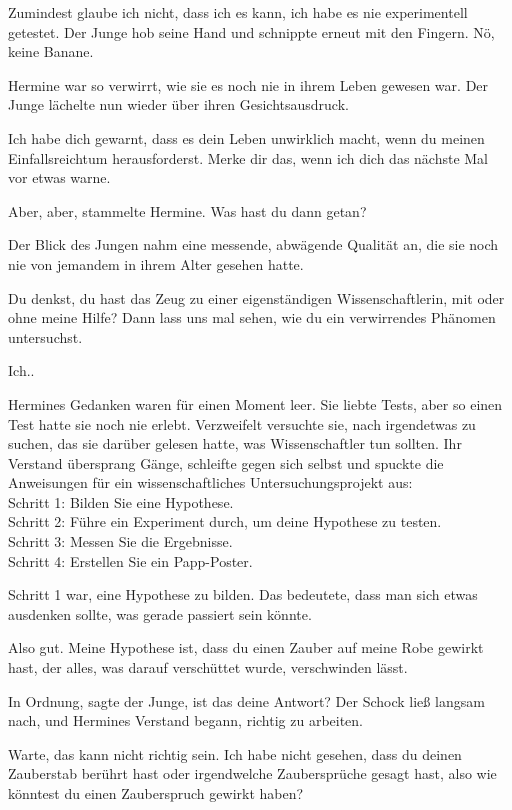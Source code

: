 \glqq{}Zumindest glaube ich nicht, dass ich es kann, ich habe es nie
experimentell getestet.\grqq{} Der Junge hob seine Hand und schnippte erneut mit
den Fingern. \glqq{}Nö, keine Banane.\grqq{}

Hermine war so verwirrt, wie sie es noch nie in ihrem Leben gewesen war. Der
Junge lächelte nun wieder über ihren Gesichtsausdruck.

\glqq{}Ich habe dich gewarnt, dass es dein Leben unwirklich macht, wenn du meinen
Einfallsreichtum herausforderst. Merke dir das, wenn ich dich das nächste Mal
vor etwas warne.\grqq{}

\glqq{}Aber, aber\grqq{}, stammelte Hermine. \glqq{}Was hast du dann getan?\grqq{}

Der Blick des Jungen nahm eine messende, abwägende Qualität an, die sie noch nie
von jemandem in ihrem Alter gesehen hatte.

\glqq{}Du denkst, du hast das Zeug zu einer eigenständigen Wissenschaftlerin, mit
oder ohne meine Hilfe? Dann lass uns mal sehen, wie du ein verwirrendes Phänomen
untersuchst.\grqq{}

\glqq{}Ich..\grqq{}

Hermines Gedanken waren für einen Moment leer. Sie liebte Tests, aber so einen
Test hatte sie noch nie erlebt. Verzweifelt versuchte sie, nach irgendetwas zu
suchen, das sie darüber gelesen hatte, was Wissenschaftler tun sollten. Ihr
Verstand übersprang Gänge, schleifte gegen sich selbst und spuckte die
Anweisungen für ein wissenschaftliches Untersuchungsprojekt aus:\\
Schritt 1: Bilden Sie eine Hypothese.\\
Schritt 2: Führe ein Experiment durch, um deine Hypothese zu testen.\\
Schritt 3: Messen Sie die Ergebnisse.\\
Schritt 4: Erstellen Sie ein Papp-Poster.

Schritt 1 war, eine Hypothese zu bilden. Das bedeutete, dass man sich etwas
ausdenken sollte, was gerade passiert sein könnte.

\glqq{}Also gut. Meine Hypothese ist, dass du einen Zauber auf meine Robe gewirkt
hast, der alles, was darauf verschüttet wurde, verschwinden lässt.\grqq{}

\glqq{}In Ordnung\grqq{}, sagte der Junge, \glqq{}ist das deine Antwort?\grqq{}
Der Schock ließ langsam nach, und Hermines Verstand begann, richtig zu arbeiten.

\glqq{}Warte, das kann nicht richtig sein. Ich habe nicht gesehen, dass du deinen
Zauberstab berührt hast oder irgendwelche Zaubersprüche gesagt hast, also wie
könntest du einen Zauberspruch gewirkt haben?\grqq{}

